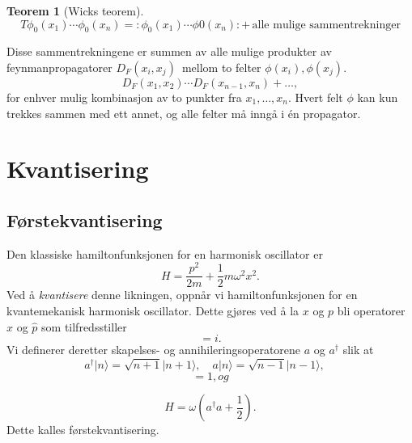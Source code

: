 \documentclass{article}
\newtheorem{theorem}{Teorem}
\newcommand{\ket}[1]{\mathopen| {#1} \rangle}
\begin{document}
\begin{theorem}[Wicks teorem]
    \begin{equation*}
    T{\phi_0(x_1) \cdots \phi_0(x_n)} = :\phi_0(x_1) \cdots \phi0(x_n): 
        + \, \text{alle mulige sammentrekninger}
    \end{equation*}
\end{theorem}
Disse sammentrekningene er summen av alle mulige produkter av feynmanpropagatorer $D_F(x_i, x_j)$ mellom to felter $\phi(x_i), \phi(x_j)$.
\begin{equation*}
    D_F(x_1, x_2) \cdots D_F(x_{n-1}, x_n) + \ldots,
\end{equation*}
for enhver mulig kombinasjon av to punkter fra ${x_1, \ldots, x_n}$. 
Hvert felt $\phi$ kan kun trekkes sammen med ett annet, og alle felter må inngå i én propagator. 


\section{Kvantisering}

\subsection{Førstekvantisering}

Den klassiske hamiltonfunksjonen for en harmonisk oscillator er
\begin{equation*}
    \label{harm_osc}
    H = \frac{p^2}{2m} + \frac{1}{2} m \omega^2 x^2.
\end{equation*}
Ved å \emph{kvantisere} denne likningen, oppnår vi hamiltonfunksjonen for en kvantemekanisk harmonisk oscillator.
Dette gjøres ved å la $x$ og $p$ bli operatorer $\hat{x}$ og $\hat{p}$ som tilfredsstiller
\begin{equation*}
    [\hat{x}, \hat{p}] = i.
\end{equation*}
Vi definerer deretter skapelses- og annihileringsoperatorene $a$ og $a^\dagger$ slik at
\begin{equation*}
    a^\dagger \ket{n} = \sqrt{n+1}\ket{n+1}, \quad
    a \ket{n} = \sqrt{n-1}\ket{n-1}, \quad
\end{equation*}
\begin{equation*}
    [a, a^\dagger] = 1, og 
\end{equation*}

\begin{equation}
    H = \omega\left(a^\dagger a + \frac{1}{2} \right).
    \label{H-kvant-1}
\end{equation}
Dette kalles førstekvantisering.
\end{document}
